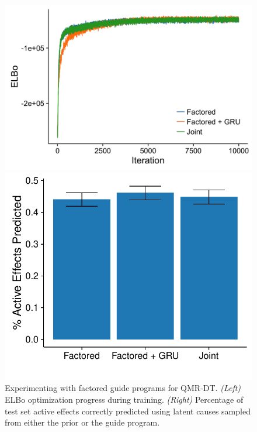 \begin{figure}[!ht]
\begin{minipage}{0.5\linewidth}
\centering
\includegraphics[width=\linewidth]{figs/results/qmr/elboProgress_factored.png}
\end{minipage}
%
\begin{minipage}{0.5\linewidth}
\centering
\includegraphics[width=\linewidth]{figs/results/qmr/reconstructScores_factored.pdf}
\end{minipage}
\caption{Experimenting with factored guide programs for QMR-DT. \emph{(Left)} ELBo optimization progress during training. \emph{(Right)} Percentage of test set active effects correctly predicted using latent causes sampled from either the prior or the guide program.}
\label{fig:qmrResults_factored}
\end{figure}


